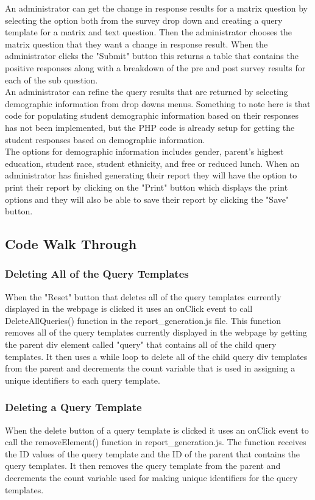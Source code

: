 \documentclass[../final.tex]{subfiles}
\begin{document}
	  An administrator can get the change in response results for a matrix question by selecting the option both from the survey drop down and creating a query template for a matrix and text question. Then the administrator chooses the matrix question that they want a change in response result. When the administrator clicks the "Submit" button this returns a table that contains the positive responses along with a breakdown of the pre and post survey results for each of the sub question.\\
	  An administrator can refine the query results that are returned by selecting demographic information from drop downs menus. Something to note here is that code for populating student demographic information based on their responses has not been implemented, but the PHP code is already setup for getting the student responses based on demographic information.\\
	   The options for demographic information includes gender, parent's highest education, student race, student ethnicity, and free or reduced lunch. When an administrator has finished generating their report they will have the option to print their report by clicking on the "Print" button which displays the print options and they will also be able to save their report by clicking the "Save" button.
	\subsection{Code Walk Through}
	\subsubsection{Deleting All of the Query Templates}
	When the "Reset" button that deletes all of the query templates currently displayed in the webpage is clicked it uses an onClick event to call DeleteAllQueries() function in the report\_generation.js file. This function removes all of the query templates currently displayed in the webpage by getting the parent div element called "query" that contains all of the child query templates. It then uses a while loop to delete all of the child query div templates from the parent and decrements the count variable that is used in assigning a unique identifiers to each query template.
	\subsubsection{Deleting a Query Template}
	When the delete button of a query template is clicked it uses an onClick event to call the removeElement() function in report\_generation.js. The function receives the ID values of the query template and the ID of the parent that contains the query templates. It then removes the query template from the parent and decrements the count variable used for making unique identifiers for the query templates.  
\end{document}
